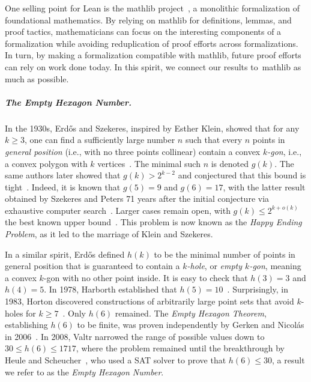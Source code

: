 One selling point for Lean is the \textsf{mathlib} project~\cite{The_mathlib_Community_2020},
a monolithic formalization of foundational mathematics.
By relying on \textsf{mathlib} for definitions, lemmas, and proof tactics,
mathematicians can focus on the interesting components of a formalization
while avoiding reduplication of proof efforts across formalizations.
In turn, by making a formalization compatible with \textsf{mathlib},
future proof efforts can rely on work done today.
In this spirit, we connect our results to~\textsf{mathlib} as much as possible.

\subparagraph*{The Empty Hexagon Number.}
In the 1930s,
Erd\H{o}s and Szekeres, inspired by Esther Klein, showed that for any $k \geq 3$,
one can find a sufficiently large number $n$
such that every $n$ points in \emph{general position}
(i.e., with no three points collinear)
contain a convex \emph{$k$-gon}, i.e., a convex polygon with $k$ vertices~\cite{35erdos_combinatorial_problem_geometry}.
The minimal such $n$ is denoted $g(k)$.
The same authors later showed that $g(k) > 2^{k-2}$
and conjectured that this bound is tight~\cite{60erdos_some_extremum_problems_elementary_geometry}.
Indeed, it is known that $g(5) = 9$ and $g(6) = 17$,
with the latter result obtained by Szekeres and Peters 71 years after the initial conjecture
via exhaustive computer search~\cite{06szekeres_computer_solution_17_point_erdos_szekeres_problem}.
Larger cases remain open,
with $g(k) \leq 2^{k+o(k)}$ the best known upper bound~\cite{suk2017erdos,holmsen2017two}.
This problem is now known as the \emph{Happy Ending Problem},
as it led to the marriage of Klein and Szekeres.

In a similar spirit,
Erd\H{o}s defined $h(k)$
to be the minimal number of points in general position
that is guaranteed to contain a \emph{$k$-hole},
or \emph{empty $k$-gon},
meaning a convex $k$-gon with no other point inside.
It is easy to check that $h(3) = 3$ and $h(4) = 5$.
In 1978, Harborth established that $h(5) = 10$~\cite{Harborth1978}.
Surprisingly, in 1983, Horton discovered constructions of arbitrarily large point sets that 
avoid $k$-holes for $k \geq 7$~\cite{hortonSetsNoEmpty1983}.
Only $h (6)$ remained.
The \emph{Empty Hexagon Theorem},
establishing $h(6)$ to be finite,
was proven independently by Gerken and Nicolás in 2006~\cite{gerkenEmptyConvexHexagons2008,nicolasEmptyHexagonTheorem2007}.
In 2008, Valtr narrowed the range of possible values down to $30 \leq h(6) \leq 1717$,
where the problem remained until the breakthrough by Heule and Scheucher~\cite{emptyHexagonNumber},
who used a SAT solver to prove that $h(6) \leq 30$,
a result we refer to as the \emph{Empty Hexagon Number}.
